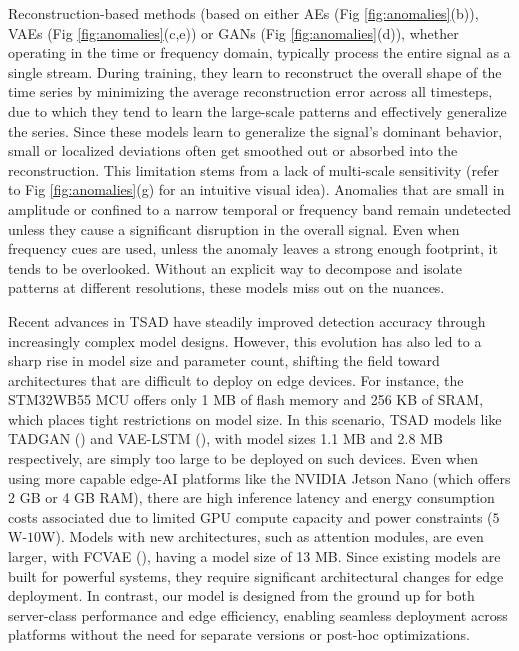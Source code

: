 Reconstruction-based methods (based on either AEs (Fig \ref{fig:anomalies}(b)), VAEs (Fig \ref{fig:anomalies}(c,e)) or GANs (Fig \ref{fig:anomalies}(d)), whether operating in the time or frequency domain, typically process the entire signal as a single stream. During training, they learn to reconstruct the overall shape of the time series by minimizing the average reconstruction error across all timesteps, due to which they tend to learn the large-scale patterns and effectively generalize the series. Since these models learn to generalize the signal’s dominant behavior, small or localized deviations often get smoothed out or absorbed into the reconstruction. This limitation stems from a lack of multi-scale sensitivity (refer to Fig \ref{fig:anomalies}(g) for an intuitive visual idea). Anomalies that are small in amplitude or confined to a narrow temporal or frequency band remain undetected unless they cause a significant disruption in the overall signal. Even when frequency cues are used, unless the anomaly leaves a strong enough footprint, it tends to be overlooked. Without an explicit way to decompose and isolate patterns at different resolutions, these models miss out on the nuances.

Recent advances in TSAD have steadily improved detection accuracy through increasingly complex model designs. However,
this evolution has also led to a sharp rise in model size and parameter count, shifting the field toward architectures
that are difficult to deploy on edge devices. For instance, the STM32WB55 MCU offers only 1 MB of flash memory and 256 KB of SRAM, which places tight
restrictions on model size. In this scenario, TSAD models like TADGAN (\cite{tadgan}) and
VAE-LSTM (\cite{tsvae}), with model sizes 1.1 MB and 2.8 MB respectively, are simply too large to be deployed on such devices. Even when using more capable edge-AI platforms like the NVIDIA Jetson Nano (which offers 2 GB or 4 GB RAM), there are high inference latency and energy consumption costs associated due to limited GPU compute capacity and power constraints ($5$W-$10$W). Models with new architectures, such as attention modules, are even larger, with FCVAE (\cite{fcvae}), having a model size of 13 MB. 
 Since existing models are built for powerful systems, they require significant architectural changes for edge deployment. In contrast, our model is designed from the ground up for both server-class performance and edge efficiency, enabling seamless deployment across platforms without the need for separate versions or post-hoc optimizations. 
 
